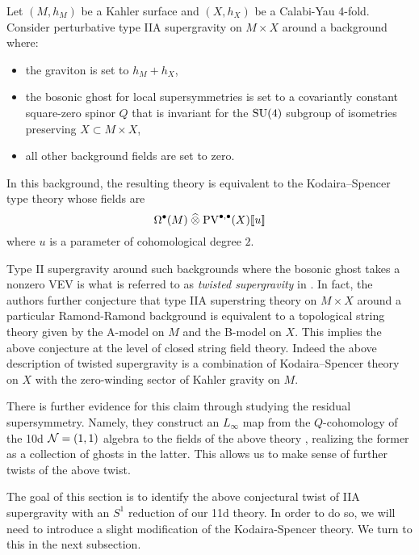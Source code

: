 \documentclass[11pt]{amsart}
\def\PV{{\rm PV}}
\begin{document}
\begin{conj}
  Let $(M,h_{M})$ be a Kahler surface and $(X, h_{X})$ be a Calabi-Yau 4-fold.
  Consider perturbative type IIA supergravity on $M\times X$ around a background where:
  \begin{itemize}
    \item the graviton is set to $h_{M}+ h_{X}$,
    \item the bosonic ghost for local supersymmetries is set to a covariantly constant square-zero spinor $Q$ that is invariant for the $\rm SU(4)$ subgroup of isometries preserving $X\subset M\times X$,
    \item all other background fields are set to zero.
  \end{itemize}
  In this background, the resulting theory is equivalent to the Kodaira--Spencer type theory whose fields are
  \[
    \Omega^{\bullet}(M) \; \Hat{\otimes} \; \PV^{\bullet, \bullet}(X)[\![u]\!]
  \]
  where $u$ is a parameter of cohomological degree $2$.
\end{conj}

Type II supergravity around such backgrounds where the bosonic ghost takes a nonzero VEV is what is referred to as {\em twisted supergravity} in \cite{CLsugra}.
In fact, the authors further conjecture that type IIA superstring theory on $M\times X$ around a particular Ramond-Ramond background is equivalent to a topological string theory given by the A-model on $M$ and the B-model on $X$.
This implies the above conjecture at the level of closed string field theory.
Indeed the above description of twisted supergravity is a combination of Kodaira--Spencer theory on $X$ with the zero-winding sector of Kahler gravity on $M$.

There is further evidence for this claim through studying the residual supersymmetry.
Namely, they construct an $L_{\infty}$ map from the $Q$-cohomology of the 10d $\mathcal N = (1,1)$ algebra to the fields of the above theory \cite{CLsugra}, realizing the former as a collection of ghosts in the latter. This allows us to make sense of further twists of the above twist.

The goal of this section is to identify the above conjectural twist of IIA supergravity with an $S^{1}$ reduction of our 11d theory. In order to do so, we will need to introduce a slight modification of the Kodaira-Spencer theory. We turn to this in the next subsection.
\end{document}

